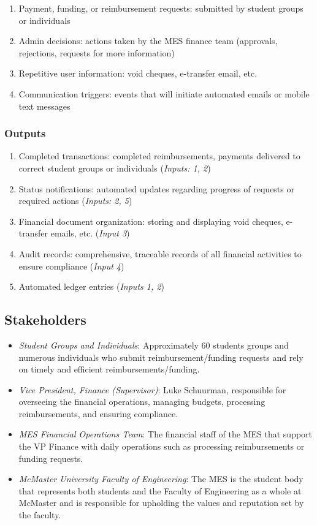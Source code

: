 \documentclass{article}
\begin{document}
\begin{enumerate}
    \item Payment, funding, or reimbursement requests: submitted by student groups or individuals
    \item Admin decisions: actions taken by the MES finance team (approvals, rejections, requests for more information)
    \item Repetitive user information: void cheques, e-transfer email, etc.
    \item Communication triggers: events that will initiate automated emails or mobile text messages
\end{enumerate}

\subsubsection{Outputs}

\begin{enumerate}
    \item Completed transactions: completed reimbursements, payments delivered to correct student groups or individuals (\emph{Inputs: 1, 2})
    \item Status notifications: automated updates regarding progress of requests or required actions (\emph{Inputs: 2, 5})
    \item Financial document organization: storing and displaying void cheques, e-transfer emails, etc. (\emph{Input 3})
    \item Audit records: comprehensive, traceable records of all financial activities to ensure compliance (\emph{Input 4})
    \item Automated ledger entries (\emph{Inputs 1, 2})
\end{enumerate}

\subsection{Stakeholders}

\begin{itemize}
    \item \emph{Student Groups and Individuals}: Approximately 60 students groups and numerous individuals who submit reimbursement/funding requests and rely on timely and efficient reimbursements/funding.
    \item \emph{Vice President, Finance (Supervisor)}: Luke Schuurman, responsible for overseeing the financial operations, managing budgets, processing reimbursements, and ensuring compliance.
    \item \emph{MES Financial Operations Team}: The financial staff of the MES that support the VP Finance with daily operations such as processing reimbursements or funding requests. 
    \item \emph{McMaster University Faculty of Engineering}: The MES is the student body that represents both students and the Faculty of Engineering as a whole at McMaster and is responsible for upholding the values and reputation set by the faculty.
\end{itemize}
\end{document}
